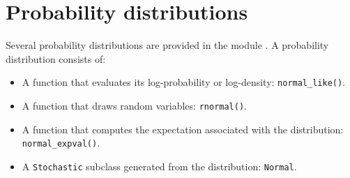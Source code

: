 \documentclass[]{manual}
\begin{document}
\chapter{Probability distributions} 
\label{chap:distributions}
Several probability distributions are provided in the module . A probability distribution consists of:
\begin{itemize}
    \item A function that evaluates its log-probability or log-density: \texttt{normal_like()}.
    \item A function that draws random variables: \texttt{rnormal()}.
    \item A function that computes the expectation associated with the distribution: \texttt{normal_expval()}.
    \item A \texttt{Stochastic} subclass generated from the distribution: \texttt{Normal}.
\end{itemize} 




\end{document}
